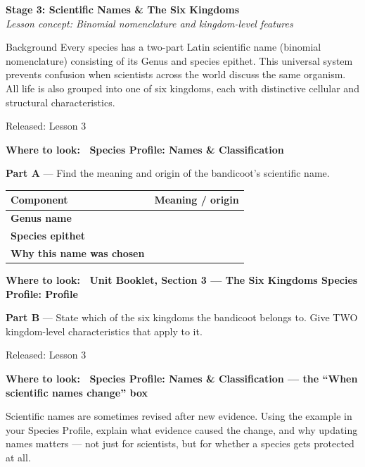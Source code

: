 \documentclass[11pt,a4paper]{article}
\newcommand{\wheretolook}[1]{%
  \par\vspace{2pt}\noindent
  \colorbox{GoldLight}{\parbox{\dimexpr\linewidth-2\fboxsep\relax}{%
    \small\color{GoldDark}\headingfont\bfseries Where to look:\ %
    \normalfont\color{DarkGrey}#1}}\par\vspace{4pt}}
\newcommand{\answerbox}[1]{%
  \begin{tcolorbox}[
    enhanced, breakable, arc=2mm,
    colback=Paper, colframe=Line,
    left=2mm, right=2mm, top=1mm, bottom=1mm,
    boxrule=1pt, height=#1
  ]
  \end{tcolorbox}%
}
\newcommand{\stagediv}[3]{%
  \needspace{6\baselineskip}
  \begin{tcolorbox}[
    enhanced, breakable=false, arc=3.5mm,
    colback=ForestDark, colframe=ForestDark, boxrule=0pt,
    sidebyside, sidebyside align=center,
    lefthand width=2.2cm,
    left=2mm, right=4mm, top=4mm, bottom=4mm
  ]
    \begin{center}
      {\headingfont\bfseries\color{Forest!35!ForestDark}\fontsize{42}{42}\selectfont #1}
    \end{center}
    \tcblower
    {\headingfont\bfseries\color{white}\large Stage #1: #2}\\[3pt]
    {\itshape\color{white!75!ForestDark}\small Lesson concept: #3}
  \end{tcolorbox}%
  \vspace{6pt}%
}
\newcommand{\yr}[2]{\noindent{\headingfont\bfseries\small\color{Forest}%
  \rule[0.2ex]{1.2em}{2pt}\hspace{4pt}#1}\hfill{\small\color{DarkGrey}#2}\\[2pt]}
\newcommand{\yrviii}[2]{\noindent{\headingfont\bfseries\small\color{Violet}%
  \rule[0.2ex]{1.2em}{2pt}\hspace{4pt}#1}\hfill{\small\color{DarkGrey}#2}\\[2pt]}
\begin{document}
\newpage

\stagediv{3}{Scientific Names \& The Six Kingdoms}{Binomial nomenclature and kingdom-level features}

\begin{contextbox}{Background}
Every species has a two-part Latin scientific name (binomial nomenclature) consisting of its Genus and species epithet. This universal system prevents confusion when scientists across the world discuss the same organism. All life is also grouped into one of six kingdoms, each with distinctive cellular and structural characteristics.
\end{contextbox}

\bigskip

\begin{yr7box}
\yr{At The Level}{Released: Lesson 3}

\wheretolook{\textbf{Species Profile: Names \& Classification}}
\textbf{Part A} --- Find the meaning and origin of the bandicoot's scientific name.

\medskip
\noindent\begin{tabularx}{\linewidth}{|>{\bfseries}p{4cm}|X|}
  \hline
  \rowcolor{TableHead}
  \headingfont\bfseries\color{white} Component &
  \headingfont\bfseries\color{white} Meaning / origin \\
  \hline
  Genus name & \\[30pt]
  \hline
  \rowcolor{RowAlt}
  Species epithet & \\[30pt]
  \hline
  Why this name was chosen & \\[30pt]
  \hline
\end{tabularx}

\bigskip
\wheretolook{Unit Booklet, Section 3 --- The Six Kingdoms \textbullet{} \textbf{Species Profile: Profile}}
\textbf{Part B} --- State which of the six kingdoms the bandicoot belongs to. Give TWO kingdom-level characteristics that apply to it.
\answerbox{7cm}
\end{yr7box}

\bigskip

\begin{yr8box}
\yrviii{Above The Level}{Released: Lesson 3}
\wheretolook{\textbf{Species Profile: Names \& Classification} --- the ``When scientific names change'' box}
Scientific names are sometimes revised after new evidence. Using the example in your Species Profile, explain what evidence caused the change, and why updating names matters --- not just for scientists, but for whether a species gets protected at all.
\answerbox{14cm}
\end{yr8box}
\end{document}
